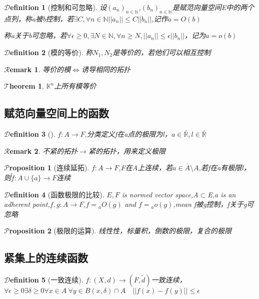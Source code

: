 \documentclass[hyperfer,UTF8,a4paper,12pt]{article}
\theoremstyle{plain}
\newtheorem{Thm}{$\mathcal{T}$heorem}
\newtheorem*{Prop}{$\mathcal{P}$roposition}
\newtheorem*{Remark}{$\mathcal{R}$emark}
\newtheorem{Def}{{$\mathcal{D}$efinition}}[section]
\begin{document}
\begin{Def}[控制和可忽略]
	设$ (a_n)_{n\in\mathbb{N}} $,$ (b_n)_{n\in\mathbb{N}} $是赋范向量空间E中的两个点列，称a被b控制，若$ \exists C ,\forall n\in\mathbb{N}  ||a_n||\leq C||b_n||$,记作$ a=O(b) $

	称a关于b可忽略，若$ \forall \epsilon\ge 0,\exists N\in\mathbb{N},\forall n\ge N,||a_n||\leq\epsilon ||b_n|| $，记为$ a=o(b) $
\end{Def}

\begin{Def}[模的等价]
	称$ N_1,N_2 $是等价的，若他们可以相互控制
\end{Def}
\begin{Remark}
	等价的模$ \Leftrightarrow $诱导相同的拓扑
\end{Remark}


\begin{Thm}
	$ \mathbb{K}^n $上所有模等价
\end{Thm}

\subsection{赋范向量空间上的函数}

\begin{Def}[]
	$ f:A\to F $,分类定义f在a点的极限为l，$ a\in\overline{\mathbb{R}},l\in\overline{\mathbb{R}} $
\end{Def}

\begin{Remark}
	不紧的拓扑$\to$紧的拓扑，用来定义极限
\end{Remark}

\begin{Prop}[连续延拓]
	$ f:A\to F $,F在A上连续，若$ a\in\overline{A}\setminus A $,若f在a有极限l，则$ \tilde{f}:A\cup\{a\}\to F $连续
\end{Prop}

\begin{Def}[函数极限的比较]
	$ E,F  $ is normed vector space,A$\subset$E,a is an adherent point,$ f,g:A\to F $,$ f={}_a O(g) $ and $ f={}_a o(g)$,mean f被g控制，f关于g可忽略
\end{Def}

\begin{Prop}[极限的运算]
	线性性，标量积，倒数的极限，复合的极限
\end{Prop}

\subsection{紧集上的连续函数}
\begin{Def}[一致连续]
	$ f:(X,d)\to(F,\tilde{d}) $一致连续，$ \forall\epsilon\ge0\exists\delta\ge0\forall x\in A\ \forall y\in B(x,\delta)\cap A \quad ||f(x)-f(y)||\le\epsilon$
\end{Def}
\end{document}
